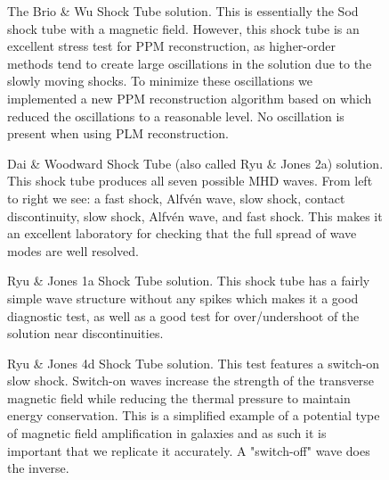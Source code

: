 \begin{figure}[ht!]
    \caption{The Brio \& Wu Shock Tube solution. This is essentially the Sod shock tube with a magnetic field. However, this shock tube is an excellent stress test for PPM reconstruction, as higher-order methods tend to create large oscillations in the solution due to the slowly moving shocks. To minimize these oscillations we implemented a new PPM reconstruction algorithm based on \cite{felker_2018} which reduced the oscillations to a reasonable level. No oscillation is present when using PLM reconstruction.
    }
    \label{fig:brio-and-wu}
\end{figure}

\begin{figure}[ht!]
    \caption{Dai \& Woodward Shock Tube (also called Ryu \& Jones 2a) solution. This shock tube produces all seven possible MHD waves. From left to right we see: a fast shock, Alfvén wave, slow shock, contact discontinuity, slow shock, Alfvén wave, and fast shock. This makes it an excellent laboratory for checking that the full spread of wave modes are well resolved.
    }
    \label{fig:dai-and-woodward}
\end{figure}

\begin{figure}[ht!]
    \caption{Ryu \& Jones 1a Shock Tube solution. This shock tube has a fairly simple wave structure without any spikes which makes it a good diagnostic test, as well as a good test for over/undershoot of the solution near discontinuities.
    }
    \label{fig:rj-1a}
\end{figure}

\begin{figure}[ht!]
    \caption{Ryu \& Jones 4d Shock Tube solution. This test features a switch-on slow shock. Switch-on waves increase the strength of the transverse magnetic field while reducing the thermal pressure to maintain energy conservation. This is a simplified example of a potential type of magnetic field amplification in galaxies and as such it is important that we replicate it accurately. A "switch-off" wave does the inverse.
    }
    \label{fig:rj-4d}
\end{figure}

